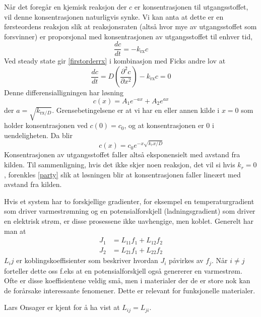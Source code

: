 Når det foregår en kjemisk reaksjon der $c$ er konsentrasjonen til utgangsstoffet, vil denne konsentrasjonen naturligvis synke. Vi kan anta at dette er en førsteordens reaksjon slik at reaksjonsraten (altså hvor mye av utgangsstoffet som forsvinner) er proporsjonal med konsentrasjonen av utgangsstoffet til enhver tid,
\begin{equation}
	\label{firstorderrx}
	\frac{dc}{dt}=-k_{\text{rx}}c
\end{equation}
Ved steady state gir \eqref{firstorderrx} i kombinasjon med Ficks andre lov at
\begin{equation}
	\label{party}
	\frac{dc}{dt}=D\left(\frac{\partial^2 c}{\partial x^2}\right)-k_{\text{rx}}c=0
\end{equation}
Denne differensialligningen har løsning
\begin{equation}
	c(x)=A_1e^{-ax}+A_2e^{ax}
\end{equation}
der $a=\sqrt{k_{\text{rx}/D}}$. Grensebetingelsene er at vi har en eller annen kilde i $x=0$ som holder konsentrasjonen ved $c(0)=c_0$, og at konsentrasjonen er $0$ i uendeligheten. Da blir
\begin{equation}
	c(x)=c_0e^{-x\sqrt{k_rx/D}}
\end{equation}
Konsentrasjonen av utgangsstoffet faller altså eksponensielt med avstand fra kilden. Til sammenligning, hvis det ikke skjer noen reaksjon, det vil si hvis $k_r=0$, forenkles \eqref{party} slik at løsningen blir at konsentrasjonen faller lineært med avstand fra kilden.

Hvis et system har to forskjellige gradienter, for eksempel en temperaturgradient som driver varmestrømning og en potensialforskjell (ladningsgradient) som driver en elektrisk strøm, er disse prosessene ikke uavhengige, men koblet. Generelt har man at
\begin{align}
    J_1&=L_{11}f_1+L_{12}f_2 \\
    J_2&=L_{21}f_1+L_{22}f_2
\end{align}
$L_ij$ er koblingskoeffisienter som beskriver hvordan $J_i$ påvirkes av $f_j$. Når $i\neq j$ forteller dette oss f.eks at en potensialforskjell også genererer en varmestrøm. Ofte er disse koeffisientene veldig små, men i materialer der de er store nok kan de forårsake interessante fenomener. Dette er relevant for funksjonelle materialer. 

Lars Onsager er kjent for å ha vist at $L_{ij}=L_{ji}$.